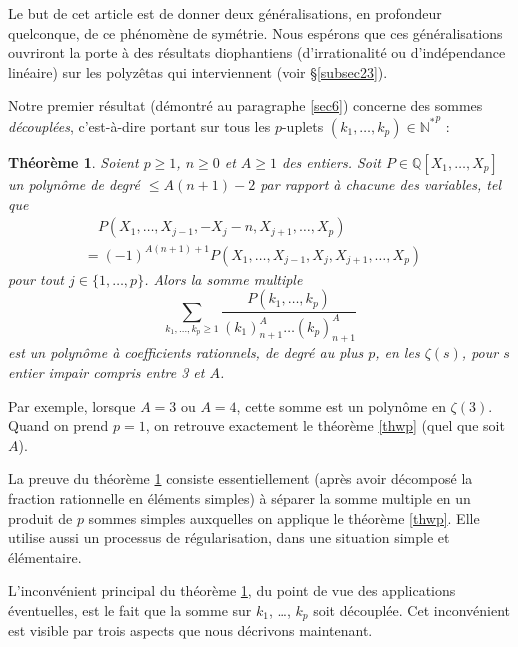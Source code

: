 \documentclass[12pt,francais, reqno]{smfart}
\numberwithin{equation}{section}
\newcommand{\Q}{\mathbb Q}
\newcommand{\unp}{\{1,\ldots, p\}}
\newcommand{\N}{\mathbb{N}}
\newcommand{\Netoile}{{\N ^*}}
\newtheorem{Th}{Th\'eor\`eme}
\begin{document}
Le but de cet article est de donner deux g\'en\'eralisations, en profondeur quelconque, 
de ce ph\'enom\`ene de sym\'etrie. Nous esp\'erons que ces g\'en\'eralisations ouvriront 
la porte \`a des r\'esultats diophantiens (d'irrationalit\'e ou d'ind\'ependance lin\'eaire) sur les polyz\^etas qui interviennent (voir \S \ref{subsec23}). 

\bigskip

Notre premier r\'esultat (d\'emontr\'e au paragraphe \ref{sec6}) concerne des 
sommes {\em d\'ecoupl\'ees}, c'est-\`a-dire portant sur tous les $p$-uplets $(k_1, \ldots, k_p) \in \Netoile ^p$ :

\begin{Th} \label{thdecouple}
Soient $p \geq 1$, $n \geq 0$ et $A \geq 1$ des entiers.
Soit $P \in \Q[X_1, \ldots, X_p]$ un polyn\^ome de degr\'e $\leq A(n+1)-2$ par rapport \`a chacune des variables, tel que
\begin{multline*}
\quad P(X_1,\ldots, X_{j-1}, -X_j-n, X_{j+1}, \ldots, X_p ) 
\\
= (-1)^{A(n+1)+1} P( X_1,\ldots, X_{j-1}, X_j, X_{j+1}, \ldots, X_p )\quad 
\end{multline*}
pour tout $j \in \unp$. Alors la somme multiple
\begin{equation} \label{eqdecouple}
\sum_{k_1,  \ldots ,  k_p \ge 1} 
\frac{P(k_1, \ldots, k_p)}{(k_1)_{n+1}^{A} \ldots (k_p)_{n+1}^{A} }
\end{equation}
est un polyn\^ome  \`a coefficients rationnels, de degr\'e au plus $p$,  en les  $\zeta(s)$, pour $s$ entier impair compris entre 3 et $A$.
\end{Th}
Par exemple, lorsque $A=3$ ou $A=4$, cette somme est un polyn\^ome en $\zeta(3)$. Quand on prend 
$p=1$, on retrouve exactement le th\'eor\`eme \ref{thwp} (quel que soit $A$). 



La preuve du th\'eor\`eme  \ref{thdecouple} consiste essentiellement (apr\`es avoir d\'ecompos\'e 
la fraction rationnelle en \'el\'ements simples)  \`a s\'eparer la somme multiple en un produit 
de $p$ sommes simples auxquelles on applique le th\'eor\`eme \ref{thwp}. Elle utilise aussi un 
processus de r\'egularisation, dans une situation simple et \'el\'ementaire. 

\bigskip

L'inconv\'enient principal du th\'eor\`eme \ref{thdecouple}, du point de vue des applications 
\'eventuelles, est le fait que la somme sur $k_1$, \ldots, $k_p$ soit d\'ecoupl\'ee. Cet
inconv\'enient est visible par trois aspects que nous d\'ecrivons maintenant.
\end{document}

